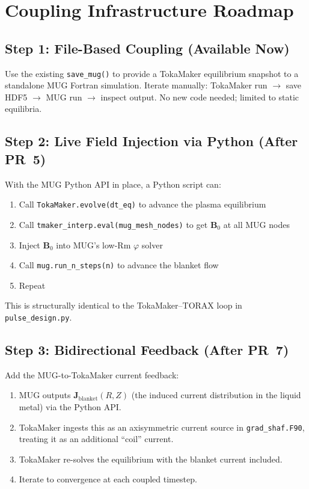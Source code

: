 \documentclass[11pt,letterpaper]{article}
\begin{document}
\section{Coupling Infrastructure Roadmap}
\label{sec:coupling_roadmap}

\subsection{Step 1: File-Based Coupling (Available Now)}

Use the existing \texttt{save\_mug()} to provide a TokaMaker equilibrium
snapshot to a standalone MUG Fortran simulation.  Iterate manually:
TokaMaker run $\to$ save HDF5 $\to$ MUG run $\to$ inspect output.
No new code needed; limited to static equilibria.

\subsection{Step 2: Live Field Injection via Python (After PR~5)}

With the MUG Python API in place, a Python script can:
\begin{enumerate}
  \item Call \texttt{TokaMaker.evolve(dt\_eq)} to advance the plasma equilibrium
  \item Call \texttt{tmaker\_interp.eval(mug\_mesh\_nodes)} to get
    $\mathbf{B}_0$ at all MUG nodes
  \item Inject $\mathbf{B}_0$ into MUG's low-Rm $\varphi$ solver
  \item Call \texttt{mug.run\_n\_steps(n)} to advance the blanket flow
  \item Repeat
\end{enumerate}
This is structurally identical to the TokaMaker--TORAX loop in
\texttt{pulse\_design.py}.

\subsection{Step 3: Bidirectional Feedback (After PR~7)}

Add the MUG-to-TokaMaker current feedback:
\begin{enumerate}
  \item MUG outputs $\mathbf{J}_{\mathrm{blanket}}(R,Z)$ (the induced current
    distribution in the liquid metal) via the Python API.
  \item TokaMaker ingests this as an axisymmetric current source in
    \texttt{grad\_shaf.F90}, treating it as an additional ``coil'' current.
  \item TokaMaker re-solves the equilibrium with the blanket current included.
  \item Iterate to convergence at each coupled timestep.
\end{enumerate}
\end{document}
